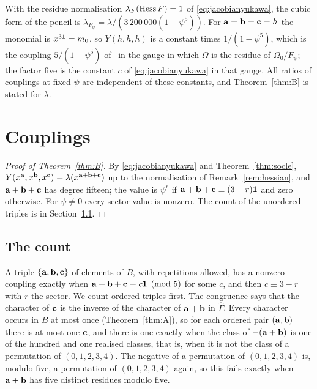 \begin{remark}[Normalisation]\label{rem:hessian}
With the residue normalisation $\lambda_{F}(\operatorname{Hess} F)=1$ of
\eqref{eq:jacobianyukawa}, the cubic form of the pencil is
$\lambda_{F_\psi}=\lambda/(3\,200\,000(1-\psi^5))$. For $\mathbf{a}=\mathbf{b}=\mathbf{c}=h$ the
monomial is $x^{3\mathbf{1}}=m_0$, so $Y(h,h,h)$ is a constant times
$1/(1-\psi^5)$, which is the coupling $5/(1-\psi^5)$ of~\cite{CDGP91} in
the gauge in which $\Omega$ is the residue of $\Omega_0/F_\psi$; the
factor five is the constant $c$ of \eqref{eq:jacobianyukawa} in that gauge.
All ratios of couplings at fixed $\psi$ are independent of these
constants, and Theorem~\ref{thm:B} is stated for $\lambda$.
\end{remark}

\section{Couplings}\label{sec:couplings}

\begin{proof}[Proof of Theorem~\ref{thm:B}]
By \eqref{eq:jacobianyukawa} and Theorem~\ref{thm:socle},
$Y(x^{\mathbf{a}},x^{\mathbf{b}},x^{\mathbf{c}})=\lambda(x^{\mathbf{a}+\mathbf{b}+\mathbf{c}})$ up to the
normalisation of Remark~\ref{rem:hessian}, and $\mathbf{a}+\mathbf{b}+\mathbf{c}$ has degree
fifteen; the value is $\psi^r$ if $\mathbf{a}+\mathbf{b}+\mathbf{c}\equiv(3-r)\mathbf{1}$ and zero
otherwise. For $\psi\ne0$ every sector value is nonzero. The count of the
unordered triples is in Section~\ref{sec:count}.
\end{proof}

\subsection{The count}\label{sec:count}

A triple $\{\mathbf{a},\mathbf{b},\mathbf{c}\}$ of elements of $B$, with repetitions allowed, has
a nonzero coupling exactly when $\mathbf{a}+\mathbf{b}+\mathbf{c}\equiv c\mathbf{1}\pmod5$ for some
$c$, and then $c\equiv3-r$ with $r$ the sector. We count ordered triples
first. The congruence says that the character of $\mathbf{c}$ is the inverse of the
character of $\mathbf{a}+\mathbf{b}$ in $\widehat\Gamma$. Every character occurs in $B$ at
most once (Theorem~\ref{thm:A}), so for each ordered pair $(\mathbf{a},\mathbf{b})$ there
is at most one $\mathbf{c}$, and there is one exactly when the class of
$-(\mathbf{a}+\mathbf{b})$ is one of the hundred and one realised classes, that is, when it
is not the class of a permutation of $(0,1,2,3,4)$. The negative of a
permutation of $(0,1,2,3,4)$ is, modulo five, a permutation of
$(0,1,2,3,4)$ again, so this fails exactly when $\mathbf{a}+\mathbf{b}$ has five distinct
residues modulo five.

